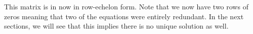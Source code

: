 This matrix is in now in row-echelon form. Note that we now have two rows of zeros meaning that two of the equations were entirely redundant. In the next sections, we will see that this implies there is no unique solution as well.




